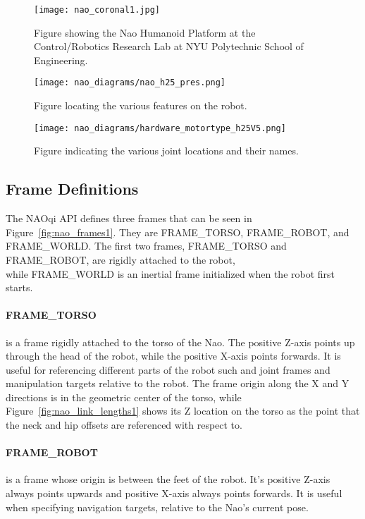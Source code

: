 \begin{figure}
\centering
\texttt{[image: nao\_coronal1.jpg]}
\caption{Figure showing the Nao Humanoid Platform at the Control/Robotics
         Research Lab at NYU Polytechnic School of Engineering.}
\label{fig:crrl_nao_coronal1}
\end{figure}

\begin{figure}
\centering
\texttt{[image: nao\_diagrams/nao\_h25\_pres.png]}
\caption{Figure locating the various features on the robot.}
\label{fig:nao_features1}
\end{figure}

\begin{figure}
\centering
\texttt{[image: nao\_diagrams/hardware\_motortype\_h25V5.png]}
\caption{Figure indicating the various joint locations and their names.}
\label{fig:nao_joints1}
\end{figure}

\FloatBarrier

\subsection{Frame Definitions}
The NAOqi API defines three frames that can be seen in Figure~\ref{fig:nao_frames1}.
They are FRAME\_TORSO, FRAME\_ROBOT, and FRAME\_WORLD\@.
The first two frames, FRAME\_TORSO and FRAME\_ROBOT, are rigidly attached to the robot, \\
while FRAME\_WORLD is an inertial frame initialized
when the robot first starts.

\paragraph{FRAME\_TORSO} 
is a frame rigidly attached to the torso of the Nao. The positive Z-axis points
up through the head of the robot, while the positive X-axis points forwards.
It is useful for referencing different parts of the robot such and joint frames
and manipulation targets relative to the robot.
The frame origin along the X and Y directions is in the geometric center
of the torso, while Figure~\ref{fig:nao_link_lengths1} shows its Z location on
the torso as the point that the neck and hip offsets are referenced with
respect to.

\paragraph{FRAME\_ROBOT}
is a frame whose origin is between the feet of the robot. It's positive Z-axis
always points upwards and positive X-axis always points forwards. It is useful
when specifying navigation targets, relative to the Nao's current pose.

